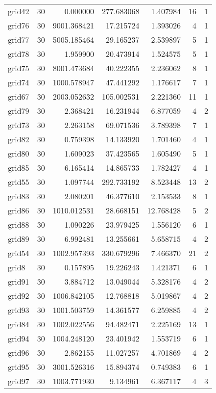 \begin{longtable}{|l|r|r|r|r|r|r|}
grid42 & 30 & 0.000000 & 277.683068 & 1.407984 & 16 & 1 \\
grid76 & 30 & 9001.368421 & 17.215724 & 1.393026 & 4 & 1 \\
grid77 & 30 & 5005.185464 & 29.165237 & 2.539897 & 5 & 1 \\
grid78 & 30 & 1.959900 & 20.473914 & 1.524575 & 5 & 1 \\
grid75 & 30 & 8001.473684 & 40.222355 & 2.236062 & 8 & 1 \\
grid74 & 30 & 1000.578947 & 47.441292 & 1.176617 & 7 & 1 \\
grid67 & 30 & 2003.052632 & 105.002531 & 2.221360 & 11 & 1 \\
grid79 & 30 & 2.368421 & 16.231944 & 6.877059 & 4 & 2 \\
grid73 & 30 & 2.263158 & 69.071536 & 3.789398 & 7 & 1 \\
grid82 & 30 & 0.759398 & 14.133920 & 1.701460 & 4 & 1 \\
grid80 & 30 & 1.609023 & 37.423565 & 1.605490 & 5 & 1 \\
grid85 & 30 & 6.165414 & 14.865733 & 1.782427 & 4 & 1 \\
grid55 & 30 & 1.097744 & 292.733192 & 8.523448 & 13 & 2 \\
grid83 & 30 & 2.080201 & 46.377610 & 2.153533 & 8 & 1 \\
grid86 & 30 & 1010.012531 & 28.668151 & 12.768428 & 5 & 2 \\
grid88 & 30 & 1.090226 & 23.979425 & 1.556120 & 6 & 1 \\
grid89 & 30 & 6.992481 & 13.255661 & 5.658715 & 4 & 2 \\
grid54 & 30 & 1002.957393 & 330.679296 & 7.466370 & 21 & 2 \\
grid8 & 30 & 0.157895 & 19.226243 & 1.421371 & 6 & 1 \\
grid91 & 30 & 3.884712 & 13.049044 & 5.328176 & 4 & 2 \\
grid92 & 30 & 1006.842105 & 12.768818 & 5.019867 & 4 & 2 \\
grid93 & 30 & 1001.503759 & 14.361577 & 6.259885 & 4 & 2 \\
grid84 & 30 & 1002.022556 & 94.482471 & 2.225169 & 13 & 1 \\
grid94 & 30 & 1004.248120 & 23.401942 & 1.553719 & 6 & 1 \\
grid96 & 30 & 2.862155 & 11.027257 & 4.701869 & 4 & 2 \\
grid95 & 30 & 3001.526316 & 15.894374 & 0.749383 & 6 & 1 \\
grid97 & 30 & 1003.771930 & 9.134961 & 6.367117 & 4 & 3 \\

\end{longtable}
